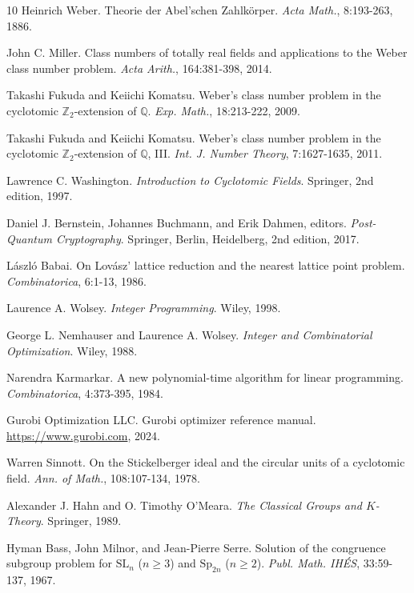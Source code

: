 \documentclass[11pt,a4paper]{article}
\theoremstyle{plain}
\theoremstyle{definition}
\theoremstyle{remark}
\begin{document}
\begin{thebibliography}{10}
Heinrich Weber.
 Theorie der Abel'schen Zahlk\"{o}rper.
 {\em Acta Math.}, 8:193-263, 1886.

John C. Miller.
 Class numbers of totally real fields and applications to the Weber class number problem.
 {\em Acta Arith.}, 164:381-398, 2014.

Takashi Fukuda and Keiichi Komatsu.
 Weber's class number problem in the cyclotomic $\mathbb{Z}_2$-extension of $\mathbb{Q}$.
 {\em Exp.  Math.}, 18:213-222, 2009.

Takashi Fukuda and Keiichi Komatsu.
 Weber's class number problem in the cyclotomic $\mathbb{Z}_2$-extension of $\mathbb{Q}$, {III}.
 {\em Int.  J.  Number Theory}, 7:1627-1635, 2011.

Lawrence C. Washington.
 {\em Introduction to Cyclotomic Fields}.
 Springer, 2nd edition, 1997.

Daniel J. Bernstein, Johannes Buchmann, and Erik Dahmen, editors.
 {\em Post-Quantum Cryptography}.
 Springer, Berlin, Heidelberg, 2nd edition, 2017.

L\'{a}szl\'{o} Babai.
 On Lov\'{a}sz' lattice reduction and the nearest lattice point problem.
 {\em Combinatorica}, 6:1-13, 1986.

Laurence A. Wolsey.
 {\em Integer Programming}.
 Wiley, 1998.

George L. Nemhauser and Laurence A. Wolsey.
 {\em Integer and Combinatorial Optimization}.
 Wiley, 1988.

Narendra Karmarkar.
 A new polynomial-time algorithm for linear programming.
 {\em Combinatorica}, 4:373-395, 1984.

{Gurobi Optimization LLC}.
 Gurobi optimizer reference manual.
 \url{https://www.gurobi.com}, 2024.

Warren Sinnott.
 On the {S}tickelberger ideal and the circular units of a cyclotomic field.
 {\em Ann.  of Math.}, 108:107-134, 1978.

Alexander J. Hahn and O. Timothy O'Meara.
 {\em The Classical Groups and $K$-Theory}.
 Springer, 1989.

Hyman Bass, John Milnor, and Jean-Pierre Serre.
 Solution of the congruence subgroup problem for $\mathrm{SL}_n$ ($n\ge 3$) and $\mathrm{Sp}_{2n}$ ($n\ge 2$).
 {\em Publ.  Math.  IH\'{E}S}, 33:59-137, 1967.


\end{thebibliography}
\end{document}
